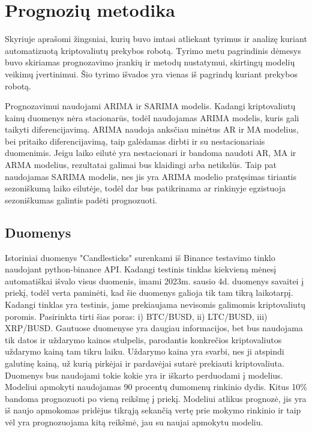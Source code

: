 \documentclass{VUMIFInfKursinis}
\begin{document}
\section{Prognozių metodika}

Skyriuje aprašomi žingsniai, kurių buvo imtasi atliekant tyrimus ir analizę kuriant automatizuotą kriptovaliutų prekybos robotą. 
Tyrimo metu pagrindinis dėmesys buvo skiriamas prognozavimo įrankių ir metodų nustatymui, skirtingų modelių veikimų įvertinimui. 
Šio tyrimo išvados yra vienas iš pagrindų kuriant prekybos robotą.

Prognozavimui naudojami ARIMA ir SARIMA modelis. Kadangi kriptovaliutų kainų duomenys nėra stacionarūs, todėl naudojamas ARIMA modelis, kuris gali taikyti diferencijavimą.
ARIMA naudoja anksčiau minėtus AR ir MA modelius, bei pritaiko diferencijavimą, taip galėdamas dirbti ir su nestacionariais duomenimis. 
Jeigu laiko eilutė yra nestacionari ir bandoma naudoti AR, MA ir ARMA modelius, rezultatai galimai bus klaidingi arba netikslūs.
Taip pat naudojamas SARIMA modelis, nes jis yra ARIMA modelio pratęsimas tiriantis sezoniškumą laiko eilutėje, todėl dar bus patikrinama ar rinkinyje egzistuoja sezoniškumas
galintis padėti prognozuoti.

\subsection{Duomenys}
Istoriniai duomenys "Candlesticks" surenkami iš Binance testavimo tinklo naudojant python-binance API. Kadangi testinis tinklas kiekvieną mėnesį automatiškai 
išvalo visus duomenis, imami 2023m. sausio 4d. duomenys savaitei į priekį, todėl verta paminėti, kad šie duomenys galioja tik tam tikrą laikotarpį. 
Kadangi tinklas yra testinis, jame prekiaujama nevisomis galimomis kriptovaliutų poromis. Pasirinkta tirti šias poras: 
i) BTC/BUSD, ii) LTC/BUSD, iii) XRP/BUSD.
Gautuose duomenyse yra daugiau informacijos, bet bus naudojama tik datos ir uždarymo kainos stulpelis, parodantis konkrečios kriptovaliutos uždarymo kainą tam tikru laiku. 
Uždarymo kaina yra svarbi, nes ji atspindi galutinę kainą, už kurią pirkėjai ir pardavėjai sutarė prekiauti kriptovaliuta. 
Duomenys bus naudojami tokie kokie yra ir iškarto perduodami į modelius. Modeliui apmokyti naudojamas 90 procentų dumomenų rinkinio dydis.
Kitus 10\% bandoma prognozuoti po vieną reikšmę į priekį. Modeliui atlikus prognozė, jis yra iš naujo apmokomas pridėjus tikrąją sekančią vertę prie mokymo rinkinio ir
taip vėl yra prognozuojama kitą reikšmė, jau su naujai apmokytu modeliu.
\end{document}
